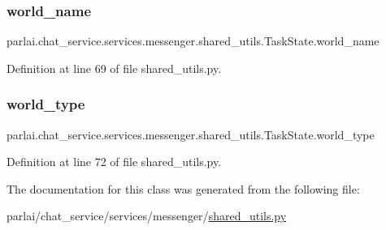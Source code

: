 \subsubsection{\texorpdfstring{world\+\_\+name}{world\_name}}
{\footnotesize\ttfamily parlai.\+chat\+\_\+service.\+services.\+messenger.\+shared\+\_\+utils.\+Task\+State.\+world\+\_\+name}



Definition at line 69 of file shared\+\_\+utils.\+py.

\mbox{\label{classparlai_1_1chat__service_1_1services_1_1messenger_1_1shared__utils_1_1TaskState_a10ad5170d1a6686bed914cb5b070fc6c}} 
\subsubsection{\texorpdfstring{world\+\_\+type}{world\_type}}
{\footnotesize\ttfamily parlai.\+chat\+\_\+service.\+services.\+messenger.\+shared\+\_\+utils.\+Task\+State.\+world\+\_\+type}



Definition at line 72 of file shared\+\_\+utils.\+py.



The documentation for this class was generated from the following file\+:\begin{DoxyCompactItemize}
\item 
parlai/chat\+\_\+service/services/messenger/\hyperlink{chat__service_2services_2messenger_2shared__utils_8py}{shared\+\_\+utils.\+py}\end{DoxyCompactItemize}
